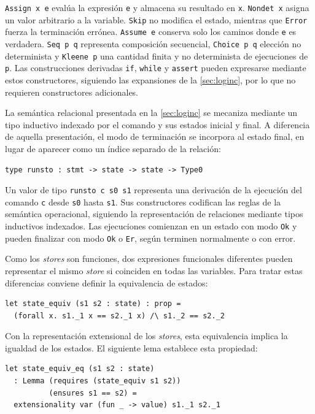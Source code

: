 \documentclass[a4paper,	11pt]{report}
\newif\ifdraft\drafttrue
\newcommand{\comm}[3]{\ifdraft{{\color{#1}[#2: #3]}}\fi}
\newcommand{\guido}[1]{\comm{blue}{Guido}{#1}}
\begin{document}
\lstinline|Assign x e| evalúa la expresión \lstinline|e| y almacena su resultado en \lstinline|x|.
\lstinline|Nondet x| asigna un valor arbitrario a la variable.
\lstinline|Skip| no modifica el estado, mientras que \lstinline|Error| fuerza la terminación errónea.
\lstinline|Assume e| conserva solo los caminos donde \lstinline|e| es verdadera.
\lstinline|Seq p q| representa composición secuencial,
\lstinline|Choice p q| elección no determinista y \lstinline|Kleene p| una cantidad finita y no determinista de ejecuciones de \lstinline|p|.
Las construcciones derivadas \lstinline|if|, \lstinline|while| y \lstinline|assert| pueden expresarse mediante estos constructores,
siguiendo las expansiones de la \autoref{sec:loginc},
por lo que no requieren constructores adicionales.

La semántica relacional presentada en la \autoref{sec:loginc} se mecaniza mediante un tipo inductivo indexado
por el comando y sus estados inicial y final.
A diferencia de aquella presentación,
el modo de terminación se incorpora al estado final,
en lugar de aparecer como un índice separado de la relación:
\begin{lstlisting}
type runsto : stmt -> state -> state -> Type0
\end{lstlisting}

Un valor de tipo \lstinline|runsto c s0 s1| representa una derivación
de la ejecución del comando \lstinline|c| desde \lstinline|s0| hasta \lstinline|s1|.
Sus constructores codifican las reglas de la semántica operacional,
siguiendo la representación de relaciones mediante tipos inductivos indexados.
Las ejecuciones comienzan en un estado con modo \lstinline|Ok| y pueden finalizar con modo \lstinline|Ok| o \lstinline|Er|,
según terminen normalmente o con error.

Como los \emph{stores} son funciones,
dos expresiones funcionales diferentes pueden representar el mismo \emph{store} si coinciden en todas las variables.
Para tratar estas diferencias conviene definir la equivalencia de estados:

\begin{lstlisting}
let state_equiv (s1 s2 : state) : prop =
  (forall x. s1._1 x == s2._1 x) /\ s1._2 == s2._2
\end{lstlisting}

Con la representación extensional de los \emph{stores},
esta equivalencia implica la igualdad de los estados.
El siguiente lema establece esta propiedad:

\begin{lstlisting}
let state_equiv_eq (s1 s2 : state)
  : Lemma (requires (state_equiv s1 s2))
          (ensures s1 == s2) =
  extensionality var (fun _ -> value) s1._1 s2._1
\end{lstlisting}
\end{document}
